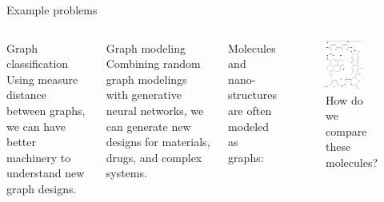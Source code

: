 \documentclass{beamer}
\begin{document}
    \begin{frame}{Example problems}
        \begin{columns}
                \begin{exampleblock}{Graph classification}
                    Using measure distance between graphs, we can have better 
                    machinery to understand new graph designs.
                \end{exampleblock}

                \pause

                \begin{exampleblock}{Graph modeling}
                    Combining random graph modelings
                    with generative neural networks,
                    we can generate new designs for materials, drugs, 
                    and complex systems.
                \end{exampleblock}

                Molecules and nano-structures are often modeled as graphs:
                \begin{figure}
                    \centering
                    \includegraphics[width=0.7\textwidth]{imgs/mutagens.png}
                    \caption{How do we compare these molecules?}
                    \label{fig:mutag_9_11}
                \end{figure}
        \end{columns}
    \end{frame}
\end{document}
